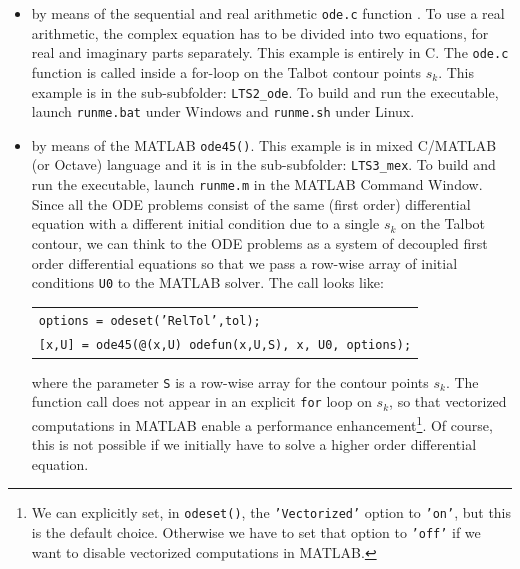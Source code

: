 \documentclass[a4paper,10pt]{report}%
\begin{document}
\begin{itemize}

\item by means of the sequential and real arithmetic {\tt ode.c} function \cite{SHAMPINE:1975,ODEf,BURKARDT:2012}. To use a real arithmetic, the complex equation has to be divided into two equations, for real and imaginary parts separately. This example is entirely in C. The {\tt ode.c} function is called inside a for-loop on the Talbot contour points $s_k$. This example is in the sub-subfolder: {\tt LTS2\_ode}. To build and run the executable, launch {\tt runme.bat} under Windows and {\tt runme.sh} under Linux.

\item by means of the MATLAB {\tt ode45()}. This example is in mixed C/MATLAB (or Octave) language and it is
in the sub-subfolder: {\tt LTS3\_mex}.  To build and run the executable, launch {\tt runme.m} in the MATLAB
Command Window.
\\
Since all the ODE problems consist of the same (first order) differential equation with a different initial condition due to a single $s_k$ on the Talbot contour, we can think to the ODE problems as a system of decoupled first order differential equations so that we pass a row-wise array of initial conditions {\tt U0} to the MATLAB solver. The call looks like:
\begin{center}
\begin{tabular}{l}
{\small\tt options = odeset('RelTol',tol);} \\
{\small\tt [x,U] = ode45(@(x,U) odefun(x,U,S), x, U0, options);}
\end{tabular}
\end{center}
where the parameter {\tt S} is a row-wise array for the contour points $s_k$. The function call does not appear in an explicit {\tt for} loop on $s_k$, so that vectorized computations in MATLAB enable a performance enhancement\footnote{ We can explicitly set, in {\tt odeset()}, the {\tt 'Vectorized'} option to {\tt 'on'}, but this is the default choice. Otherwise we have to set that option to {\tt 'off'} if we want to disable vectorized computations in MATLAB.}.
Of course, this is not possible if we initially have to solve a higher order differential equation.

\end{itemize}


\end{document}
